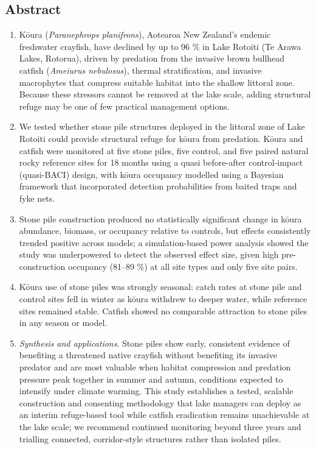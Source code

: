 \documentclass[
  letterpaper,
  DIV=11,
  numbers=noendperiod]{scrartcl}
\providecommand{\tightlist}{%
  \setlength{\itemsep}{0pt}\setlength{\parskip}{0pt}}
\begin{document}
\subsection*{Abstract}\label{abstract}

\begin{enumerate}
\def\labelenumi{\arabic{enumi}.}
\tightlist
\item
  Kōura (\emph{Paranephrops planifrons}), Aotearoa New Zealand's endemic
  freshwater crayfish, have declined by up to 96 \% in Lake Rotoiti (Te
  Arawa Lakes, Rotorua), driven by predation from the invasive brown
  bullhead catfish (\emph{Ameiurus nebulosus}), thermal stratification,
  and invasive macrophytes that compress suitable habitat into the
  shallow littoral zone. Because these stressors cannot be removed at
  the lake scale, adding structural refuge may be one of few practical
  management options.
\item
  We tested whether stone pile structures deployed in the littoral zone
  of Lake Rotoiti could provide structural refuge for kōura from
  predation. Kōura and catfish were monitored at five stone piles, five
  control, and five paired natural rocky reference sites for 18 months
  using a quasi before-after control-impact (quasi-BACI) design, with
  kōura occupancy modelled using a Bayesian framework that incorporated
  detection probabilities from baited traps and fyke nets.
\item
  Stone pile construction produced no statistically significant change
  in kōura abundance, biomass, or occupancy relative to controls, but
  effects consistently trended positive across models; a
  simulation-based power analysis showed the study was underpowered to
  detect the observed effect size, given high pre-construction occupancy
  (81--89 \%) at all site types and only five site pairs.
\item
  Kōura use of stone piles was strongly seasonal: catch rates at stone
  pile and control sites fell in winter as kōura withdrew to deeper
  water, while reference sites remained stable. Catfish showed no
  comparable attraction to stone piles in any season or model.
\item
  \emph{Synthesis and applications}. Stone piles show early, consistent
  evidence of benefiting a threatened native crayfish without benefiting
  its invasive predator and are most valuable when habitat compression
  and predation pressure peak together in summer and autumn, conditions
  expected to intensify under climate warming. This study establishes a
  tested, scalable construction and consenting methodology that lake
  managers can deploy as an interim refuge-based tool while catfish
  eradication remains unachievable at the lake scale; we recommend
  continued monitoring beyond three years and trialling connected,
  corridor-style structures rather than isolated piles.
\end{enumerate}
\end{document}
